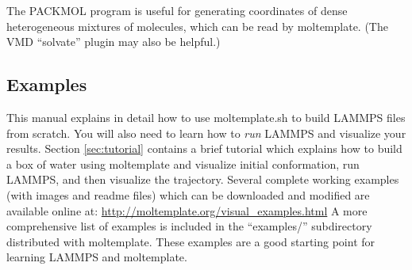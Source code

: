 \documentclass[11pt]{article}
\begin{document}

The PACKMOL \cite{packmol} program is useful for generating 
coordinates of dense heterogeneous mixtures of molecules,
which can be read by moltemplate.
(The VMD ``solvate'' plugin may also be helpful.)

\subsection*{Examples}




This manual explains in detail how to use moltemplate.sh to build LAMMPS 
files from scratch.  
You will also need to learn how to \textit{run} 
LAMMPS and visualize your results.
Section \ref{sec:tutorial} contains a brief tutorial
which explains how to build a box of water using moltemplate and 
visualize initial conformation, run LAMMPS, and then visualize the trajectory. 
Several complete working examples (with images and readme files)
which can be downloaded and modified are available online at:
\url{http://moltemplate.org/visual_examples.html}
A more comprehensive list of examples is included in
the ``examples/'' subdirectory distributed with moltemplate.  
These examples are a good starting point for learning LAMMPS and moltemplate.
\end{document}
